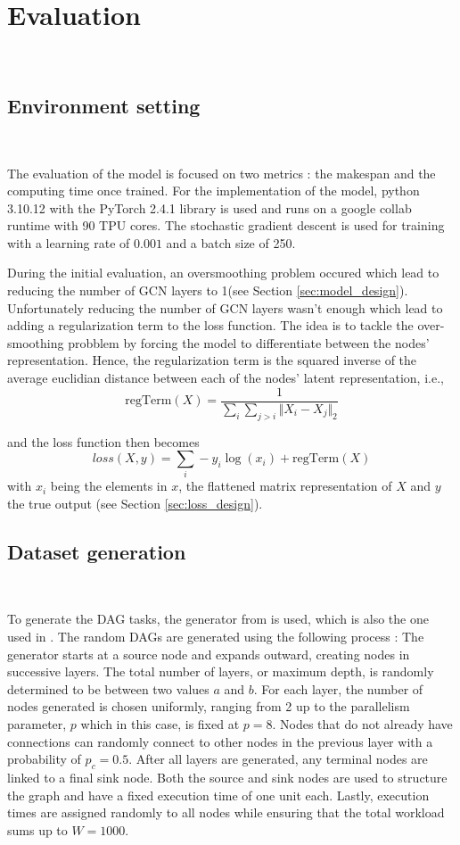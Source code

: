 \section{Evaluation}
~

\subsection{Environment setting}
~

The evaluation of the model is focused on two metrics : the makespan and the computing time once trained.
For the implementation of the model, python 3.10.12 with the PyTorch 2.4.1 library is used and runs on a google collab runtime
with 90 TPU cores.
The stochastic gradient descent is used for training with a learning rate of $0.001$ and a batch size of 250.

During the initial evaluation, an oversmoothing problem occured which lead to reducing the number of GCN layers to 1(see Section \ref{sec:model_design}).
Unfortunately reducing the number of GCN layers wasn't enough which lead 
to adding a regularization term to the loss function.
The idea is to tackle the over-smoothing probblem by forcing the model
to differentiate between the nodes' representation.
Hence, the regularization term is the squared inverse of the average euclidian distance 
between each of the nodes' latent representation, i.e., 
\begin{equation}
    \text{regTerm}(X) = \frac{1}{\sum_{i}\sum_{j > i} \Vert X_i - X_j\Vert_{2} }
\end{equation}
    
and the loss function then becomes
\begin{equation}
    loss(X, y) = \sum_{i} -y_i\log(x_i) + \text{regTerm}(X)
\end{equation}
with $x_i$ being the elements in $x$, the flattened matrix representation of $X$
and $y$ the true output (see Section \ref{sec:loss_design}).

\subsection{Dataset generation}
~

To generate the DAG tasks, the generator from \citet{zhao2020DAGsched} is used, which is also the one used in \citet{Lee2021GlobalDagSchedDRL}.
The random DAGs are generated using the following process :
The generator starts at a source node and expands outward, 
creating nodes in successive layers. The total number of layers, 
or maximum depth, is randomly determined to be between two values $a$ and $b$.
For each layer, the number of nodes generated is chosen uniformly, 
ranging from 2 up to the parallelism parameter, $p$ which in this case, 
is fixed at $p=8$. Nodes that do 
not already have connections can randomly connect to other nodes in 
the previous layer with a probability of $p_c=0.5$. After all layers 
are generated, any terminal nodes are linked to a final sink node. 
Both the source and sink nodes are used to structure the graph and 
have a fixed execution time of one unit each. Lastly, 
execution times are assigned randomly to all nodes while ensuring 
that the total workload sums up to $W = 1000$\cite{zhao2020DAGsched}.

